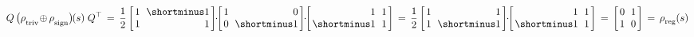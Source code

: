 \begin{align}
    Q\, \big( \rhotriv \!\oplus\mkern-1mu \rhosign \big)\mkern-2mu(s)\; Q^\top
    \,=\, \frac{1}{2}
    \begin{bmatrix} \hspace{1.5pt}
        1 &\mkern-7mu \shortminus1 \hspace*{1.5pt} \\ \hspace{1.5pt} 1 &\mkern-7mu \phantom{\shortminus}1 \hspace*{1.5pt}
    \end{bmatrix} \mkern-6mu \cdot\mkern-6mu
    \begin{bmatrix} \hspace{1.5pt}
        1 &\mkern-7mu \phantom{\shortminus}0 \hspace*{1.5pt} \\ \hspace{1.5pt} 0 &\mkern-7mu \shortminus1 \hspace*{1.5pt}
    \end{bmatrix} \mkern-6mu \cdot\mkern-6mu
    \begin{bmatrix} \hspace{1.5pt}
        \phantom{\shortminus}1 &\mkern-7mu 1 \hspace*{1.5pt} \\ \hspace{1.5pt} \shortminus1 &\mkern-7mu 1 \hspace*{1.5pt}
    \end{bmatrix}
    \,=\, \frac{1}{2}
    \begin{bmatrix} \hspace{1.5pt}
        1 &\mkern-7mu \phantom{\shortminus}1 \hspace*{1.5pt} \\ \hspace{1.5pt} 1 &\mkern-7mu \shortminus1 \hspace*{1.5pt}
    \end{bmatrix} \mkern-6mu \cdot\mkern-6mu
    \begin{bmatrix} \hspace{1.5pt}
        \phantom{\shortminus}1 &\mkern-7mu 1 \hspace*{1.5pt} \\ \hspace{1.5pt} \shortminus1 &\mkern-7mu 1 \hspace*{1.5pt}
    \end{bmatrix}
    \,=\, 
    \begin{bmatrix} \hspace{1.5pt}
        0 &\mkern-7mu 1 \hspace*{1.5pt} \\ \hspace{1.5pt} 1 &\mkern-7mu 0 \hspace*{1.5pt}
    \end{bmatrix}
    \,=\, \rhoreg(s)
\end{align}
